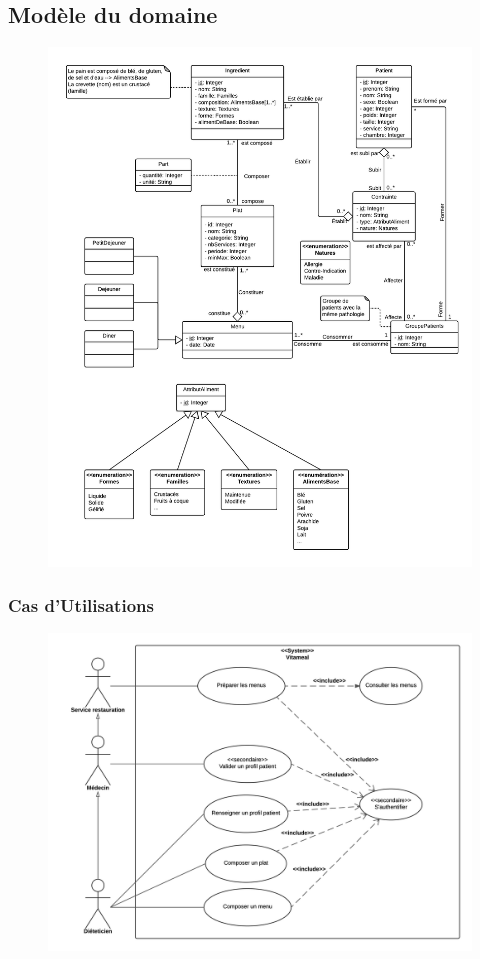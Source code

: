 \documentclass{beamer}
\begin{document}
\subsection{Modèle du domaine}
\begin{frame}[plain]{}
\begin{figure}
\centering
\includegraphics[scale=0.140]{../ModeleDuDomaine/ModeleDuDomaine.png}
\end{figure}
\end{frame}

\begin{frame}
\frametitle{Cas d'Utilisations}
\begin{figure}[H]
\label{schema}
  \centering
      \includegraphics[scale=0.4]{../CasDUtilisations/diagramme_cas_utilisation.png}
\end{figure}
\end{frame}
\end{document}
